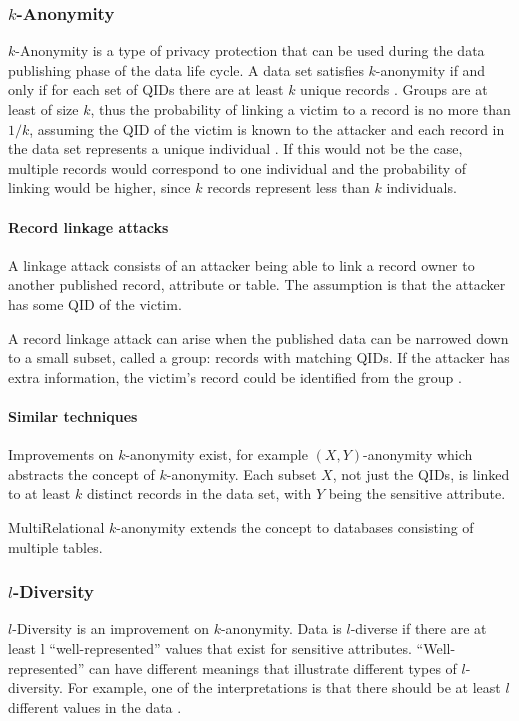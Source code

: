     \subsubsection{$k$-Anonymity}
	 $k$-Anonymity is a type of privacy protection that can be used during the data publishing phase of the data life cycle.
    A data set satisfies $k$-anonymity if and only if for each set of \gls{QID}s there are at least $k$ unique records \cite{Sweeney2002}.
    Groups are at least of size $k$, thus the probability of linking a victim to a record is no more than $1/k$,
	 assuming the \gls{QID} of the victim is known to the attacker and each record in the data set represents a unique individual \cite{Fung2010}.
    If this would not be the case, multiple records would correspond to one individual and the probability of linking would be higher,
	 since $k$ records represent less than $k$ individuals.
    
		 \paragraph{Record linkage attacks}
		 \label{s:RecordLinkage}

		 A linkage attack consists of an attacker being able to link a record owner to another published record, attribute or table.
		 The assumption is that the attacker has some \gls{QID} of the victim.
		 
		 A record linkage attack can arise when the published data can be narrowed down to a small subset, called a group:
		 records with matching \gls{QID}s.
		 If the attacker has extra information, the victim's record could be identified from the group \cite{Fung2010}.

		 \paragraph{Similar techniques}
		 Improvements on $k$-anonymity exist, for example $(X, Y)$-anonymity \cite{Fung2010} which abstracts the concept of $k$-anonymity.
		 Each subset $X$, not just the \gls{QID}s, is linked to at least $k$ distinct records in the data set, with $Y$ being the sensitive attribute.            

		 MultiRelational $k$-anonymity \cite{Fung2010} extends the concept to databases consisting of multiple tables.
            
    \subsubsection{$l$-Diversity}
    $l$-Diversity is an improvement on $k$-anonymity.
    Data is $l$-diverse if there are at least l “well-represented” values that exist for sensitive attributes. 
    “Well-represented” can have different meanings that illustrate different types of $l$-diversity.
    For example, one of the interpretations is that there should be at least $l$ different values in the data \cite{Mendes2017, Li_2007}. 

